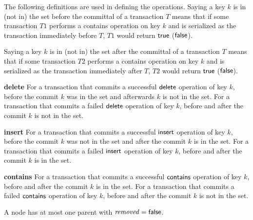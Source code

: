 The following definitions are used in defining the operations.
Saying a key $k$ is in (not in) the set before the committal of a transaction $T$ means that if some transaction $T1$ performs a contains operation on key $k$
and is serialized as the transaction immediately before $T$, $T1$ would return $\lit{true}$ ($\lit{false}$).

Saying a key $k$ is in (not in) the set after the committal of a transaction $T$ means that if some transaction $T2$ performs a contains operation on key $k$
and is serialized as the transaction immediately after $T$, $T2$ would return $\lit{true}$ ($\lit{false}$).

{\bf delete} For a transaction that commits a successful $\act{delete}$ operation of key $k$, before the commit $k$ was in the set
and afterwards $k$ is not in the set.
For a transaction that commits a failed $\act{delete}$ operation of key $k$, before and after the commit $k$ is not in the set.

{\bf insert} For a transaction that commits a successful $\act{insert}$ operation of key $k$, before the commit $k$ was not in the set and after the commit $k$ is in the set.
For a transaction that commits a failed $\act{insert}$ operation of key $k$, before and after the commit $k$ is in the set.

{\bf contains} For a transaction that commits a successful $\act{contains}$ operation of key $k$, before and after the commit $k$ is in the set.
For a transaction that commits a failed $\act{contains}$ operation of key $k$, before and after the commit $k$ is not in the set.




\begin{lemma}
\label{lemma:1-rem}
A node has at most one parent with $\ms{removed} = \lit{false}$.
\end{lemma}


